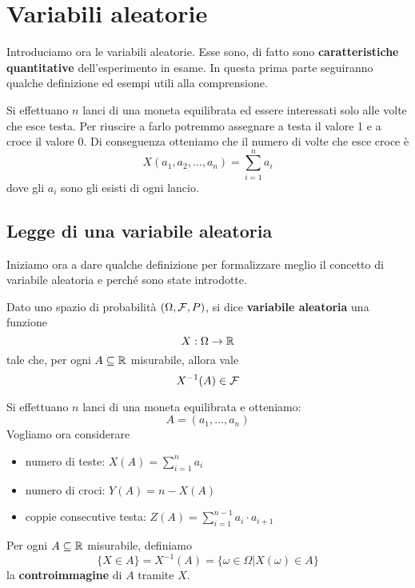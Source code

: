 \chapter{Variabili aleatorie}
Introduciamo ora le variabili aleatorie. Esse sono, di fatto sono
\textbf{caratteristiche quantitative} dell'esperimento in esame. In questa prima parte seguiranno
qualche definizione ed esempi utili alla comprensione.

\begin{example}
	Si effettuano $n$ lanci di una moneta equilibrata ed essere interessati solo alle volte che
	esce testa. Per riuscire a farlo potremmo assegnare a testa il valore 1 e a croce il valore 0.
	Di conseguenza otteniamo che il numero di volte che esce croce è
	\[ X(a_1, a_2, \dots, a_n) = \sum_{i=1}^n a_i \]
	dove gli $a_i$ sono gli esisti di ogni lancio.
\end{example}

\section{Legge di una variabile aleatoria}
Iniziamo ora a dare qualche definizione per formalizzare meglio il concetto di variabile aleatoria
e perché sono state introdotte.

\begin{definition}
	Dato uno spazio di probabilità $(\Omega, \mathcal{F}, P)$, si dice \textbf{variabile aleatoria} una
	funzione
	\[ X : \Omega \to \mathbb{R} \]
	tale che, per ogni $A \subseteq \mathbb{R}$ misurabile, allora vale
	\[ X^{-1}(A) \in \mathcal{F} \]
\end{definition}

\begin{example}
	Si effettuano $n$ lanci di una moneta equilibrata e otteniamo:
	\[ A = (a_1, \dots, a_n) \]
	Vogliamo ora considerare
	\begin{itemize}
		\item numero di teste: $X(A) = \sum_{i=1}^n a_i$
		\item numero di croci: $Y(A) = n - X(A)$
		\item coppie consecutive testa: $Z(A) = \sum_{i=1}^{n-1} a_i \cdot a_{i+1}$
	\end{itemize}
\end{example}

\begin{definition}
	Per ogni $A \subseteq \mathbb{R}$ misurabile, definiamo
	\[ \{ X \in A \} = X^{-1}(A) = \{\omega \in \Omega | X(\omega) \in A \} \]
	la \textbf{controimmagine} di $A$ tramite $X$.
\end{definition}

